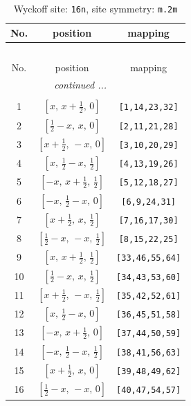 \documentclass[fleqn,8pt]{jsarticle}
\begin{document}
\renewcommand{\arraystretch}{1.2}
\begin{longtable}{ccc}
\caption{Wyckoff site: {\tt 16n}, site symmetry: {\tt m.2m}}
 \\
 \hline \hline
No. & position & mapping \\ \hline \endfirsthead

\multicolumn{2}{l}{\tablename\ \thetable{}} \\
 \hline \hline
No. & position & mapping \\ \hline \endhead

 \hline \hline
\multicolumn{2}{r}{\footnotesize\it continued ...} \\ \endfoot

 \hline \hline
\multicolumn{2}{r}{} \\ \endlastfoot

1 & $\left[ x,\, x + \frac{1}{2},\, 0 \right]$ & {\tt [1,14,23,32]} \\ \hline
2 & $\left[ \frac{1}{2} - x,\, x,\, 0 \right]$ & {\tt [2,11,21,28]} \\ \hline
3 & $\left[ x + \frac{1}{2},\, - x,\, 0 \right]$ & {\tt [3,10,20,29]} \\ \hline
4 & $\left[ x,\, \frac{1}{2} - x,\, \frac{1}{2} \right]$ & {\tt [4,13,19,26]} \\ \hline
5 & $\left[ - x,\, x + \frac{1}{2},\, \frac{1}{2} \right]$ & {\tt [5,12,18,27]} \\ \hline
6 & $\left[ - x,\, \frac{1}{2} - x,\, 0 \right]$ & {\tt [6,9,24,31]} \\ \hline
7 & $\left[ x + \frac{1}{2},\, x,\, \frac{1}{2} \right]$ & {\tt [7,16,17,30]} \\ \hline
8 & $\left[ \frac{1}{2} - x,\, - x,\, \frac{1}{2} \right]$ & {\tt [8,15,22,25]} \\ \hline
9 & $\left[ x,\, x + \frac{1}{2},\, \frac{1}{2} \right]$ & {\tt [33,46,55,64]} \\ \hline
10 & $\left[ \frac{1}{2} - x,\, x,\, \frac{1}{2} \right]$ & {\tt [34,43,53,60]} \\ \hline
11 & $\left[ x + \frac{1}{2},\, - x,\, \frac{1}{2} \right]$ & {\tt [35,42,52,61]} \\ \hline
12 & $\left[ x,\, \frac{1}{2} - x,\, 0 \right]$ & {\tt [36,45,51,58]} \\ \hline
13 & $\left[ - x,\, x + \frac{1}{2},\, 0 \right]$ & {\tt [37,44,50,59]} \\ \hline
14 & $\left[ - x,\, \frac{1}{2} - x,\, \frac{1}{2} \right]$ & {\tt [38,41,56,63]} \\ \hline
15 & $\left[ x + \frac{1}{2},\, x,\, 0 \right]$ & {\tt [39,48,49,62]} \\ \hline
16 & $\left[ \frac{1}{2} - x,\, - x,\, 0 \right]$ & {\tt [40,47,54,57]} \\
\end{longtable}
\end{document}
